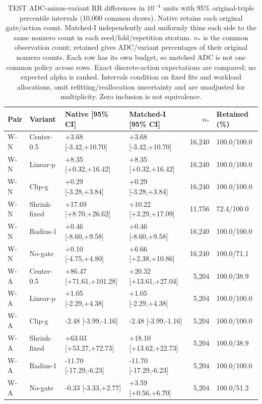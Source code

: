 \begin{table}[htbp]
\centering\footnotesize\setlength{\tabcolsep}{3pt}
\caption{TEST ADC-minus-variant RR differences in $10^{-4}$ units with 95\% original-triple percentile intervals (10,000 common draws). Native retains each original gate/action count. Matched-I independently and uniformly thins each side to the same nonzero count in each seed/fold/repetition stratum. $n_*$ is the common observation count; retained gives ADC/variant percentages of their original nonzero counts. Each row has its own budget, so matched ADC is not one common policy across rows. Exact discrete-action expectations are compared; no expected alpha is ranked. Intervals condition on fixed fits and workload allocations, omit refitting/reallocation uncertainty and are unadjusted for multiplicity. Zero inclusion is not equivalence.}
\label{tab:component-effects_test}
\begin{tabular}{llllrl}
\toprule
Pair & Variant & Native [95\% CI] & Matched-I [95\% CI] & $n_*$ & Retained (\%)\\
\midrule
W-N & Center-0.5 & +3.68 [-3.42,+10.70] & +3.68 [-3.42,+10.70] & 16,240 & 100.0/100.0\\
W-N & Linear-p & +8.35 [+0.32,+16.42] & +8.35 [+0.32,+16.42] & 16,240 & 100.0/100.0\\
W-N & Clip-g & +0.29 [-3.28,+3.84] & +0.29 [-3.28,+3.84] & 16,240 & 100.0/100.0\\
W-N & Shrink-fixed & +17.69 [+8.70,+26.62] & +10.22 [+3.29,+17.09] & 11,756 & 72.4/100.0\\
W-N & Radius-1 & +0.46 [-8.60,+9.58] & +0.46 [-8.60,+9.58] & 16,240 & 100.0/100.0\\
W-N & No-gate & +0.10 [-4.75,+4.80] & +6.66 [+2.38,+10.86] & 16,240 & 100.0/71.1\\
W-A & Center-0.5 & +86.47 [+71.61,+101.28] & +20.32 [+13.61,+27.04] & 5,204 & 100.0/38.9\\
W-A & Linear-p & +1.05 [-2.29,+4.38] & +1.05 [-2.29,+4.38] & 5,204 & 100.0/100.0\\
W-A & Clip-g & -2.48 [-3.99,-1.16] & -2.48 [-3.99,-1.16] & 5,204 & 100.0/100.0\\
W-A & Shrink-fixed & +63.03 [+53.27,+72.73] & +18.10 [+13.62,+22.73] & 5,204 & 100.0/38.9\\
W-A & Radius-1 & -11.70 [-17.29,-6.23] & -11.70 [-17.29,-6.23] & 5,204 & 100.0/100.0\\
W-A & No-gate & -0.33 [-3.33,+2.77] & +3.59 [+0.56,+6.70] & 5,204 & 100.0/51.2\\

\end{tabular}
\end{table}
